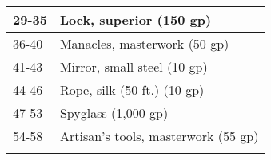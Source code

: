 \begin{longtable}{llll}
\hline
\multicolumn{3}{p{3.276in}|}{\begin{minipage}[t]{3.276in}\raggedright
29-35\end{minipage}} & \multicolumn{1}{|p{0.896in}|}{\begin{minipage}[t]{0.896in}\raggedright
Lock, superior (150 gp)\end{minipage}}\\
\hline
\multicolumn{3}{p{3.276in}|}{\begin{minipage}[t]{3.276in}\raggedright
36-40\end{minipage}} & \multicolumn{1}{|p{0.896in}|}{\begin{minipage}[t]{0.896in}\raggedright
Manacles, masterwork (50 gp)\end{minipage}}\\
\hline
\multicolumn{3}{p{3.276in}|}{\begin{minipage}[t]{3.276in}\raggedright
41-43\end{minipage}} & \multicolumn{1}{|p{0.896in}|}{\begin{minipage}[t]{0.896in}\raggedright
Mirror, small steel (10 gp)\end{minipage}}\\
\hline
\multicolumn{3}{p{3.276in}|}{\begin{minipage}[t]{3.276in}\raggedright
44-46\end{minipage}} & \multicolumn{1}{|p{0.896in}|}{\begin{minipage}[t]{0.896in}\raggedright
Rope, silk (50 ft.) (10 gp)\end{minipage}}\\
\hline
\multicolumn{3}{p{3.276in}|}{\begin{minipage}[t]{3.276in}\raggedright
47-53\end{minipage}} & \multicolumn{1}{|p{0.896in}|}{\begin{minipage}[t]{0.896in}\raggedright
Spyglass (1,000 gp)\end{minipage}}\\
\hline
\multicolumn{3}{p{3.276in}|}{\begin{minipage}[t]{3.276in}\raggedright
54-58\end{minipage}} & \multicolumn{1}{|p{0.896in}|}{\begin{minipage}[t]{0.896in}\raggedright
Artisan's tools, masterwork (55 gp)\end{minipage}}\\
\hline
\multicolumn{3}{p{3.276in}|}{\begin{minipage}[t]{3.276in}\raggedright

\end{minipage}}
\end{longtable}
